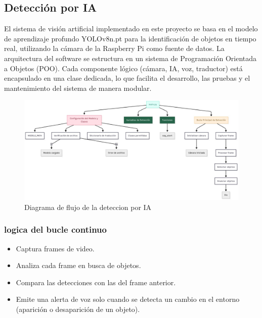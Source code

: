 \documentclass[12pt,a4paper]{article}
\begin{document}
\subsection{Detección por IA}
El sistema de visión artificial implementado en este proyecto se basa en el modelo de aprendizaje profundo YOLOv8n.pt para la identificación de objetos en tiempo real, utilizando la cámara de la Raspberry Pi como fuente de datos. La arquitectura del software se estructura en un sistema de Programación Orientada a Objetos (POO). Cada componente lógico (cámara, IA, voz, traductor) está encapsulado en una clase dedicada, lo que facilita el desarrollo, las pruebas y el mantenimiento del sistema de manera modular.

\begin{figure}[H]
\noindent\hspace*{-0.7in}%
\includegraphics[width=1.2\linewidth]{Carpeta tecnica/diagramaflujoia1.jpg}
\caption{Diagrama de flujo de la deteccion por IA}
\end{figure}

\subsubsection{logica del bucle continuo}
\begin{itemize}
\item Captura frames de video.
\item Analiza cada frame en busca de objetos.
\item Compara las detecciones con las del frame anterior.
\item Emite una alerta de voz solo cuando se detecta un cambio en el entorno (aparición o desaparición de un objeto).
\end{itemize}
\end{document}
